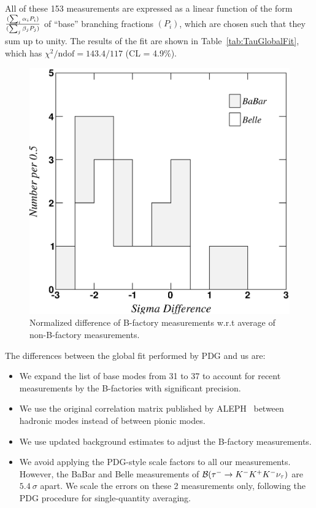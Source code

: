 \documentclass[fleqn,twoside]{article}
\begin{document}
All of these 153 measurements are expressed as a linear function
of the form $(\sum_i \alpha_i P_i )\over(\sum_j \beta_j P_j )$ 
of ``base'' branching fractions $(P_i)$, 
which are chosen such that they sum up to unity.
The results of the fit are shown in Table~\ref{tab:TauGlobalFit},
which has $\chi^2/\mathrm{ndof} = 143.4/117$ (CL = 4.9\%). 

\begin{figure}[!hbtp]
\begin{center}
\includegraphics[height=.4\textheight,width=.49\textwidth]{figures/compare_with_NoBB.eps}
\end{center}
\caption{Normalized difference of B-factory measurements w.r.t average of non-B-factory measurements.}
\label{fig:comp_NoBB}
\end{figure}
 
The differences between the global fit performed by PDG and us are:
\begin{itemize}
\item We expand the list of base modes from 31 to 37 to account for recent
  measurements by the B-factories with significant precision.
\item We use the original correlation matrix published by
 ALEPH~\cite{Schael:2005am} between hadronic modes instead of between
 pionic modes.
\item We use updated background estimates to adjust the B-factory measurements.
\item We avoid applying the PDG-style scale factors to all our measurements.
However, the BaBar and Belle measurements of ${\cal{B}}({\tau^- \to
  K^-K^+K^-\nu_\tau})$ are $5.4~\sigma$ apart. We scale the errors on
these 2 measurements only, following the PDG procedure for
single-quantity averaging.
\end{itemize}
\end{document}
